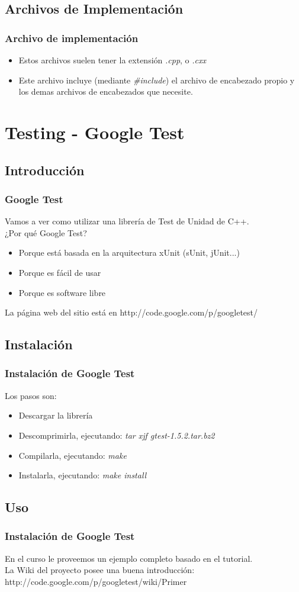 \documentclass{beamer}
\begin{document}
\subsection{Archivos de Implementación}
\begin{frame}
 \frametitle{Archivo de implementación}
\begin{itemize}

 \item Estos archivos suelen tener la extensión \emph{.cpp}, o \emph{.cxx}
 \item Este archivo incluye (mediante \emph{\#include}) el archivo de encabezado propio y los demas archivos de encabezados que necesite.
\end{itemize}

\end{frame}

\section{Testing - Google Test}

\subsection{Introducción}
\begin{frame}
\frametitle{Google Test}
Vamos a ver como utilizar una librería de Test de Unidad de C++. \\
¿Por qué Google Test?
\begin{itemize}
 \item Porque está basada en la arquitectura xUnit (sUnit, jUnit...)
 \item Porque es fácil de usar
 \item Porque es software libre
\end{itemize}

La página web del sitio está en http://code.google.com/p/googletest/

\end{frame}

\subsection{Instalación}
\begin{frame}
\frametitle{Instalación de Google Test}
Los pasos son:
\begin{itemize}
 \item Descargar la librería
 \item Descomprimirla, ejecutando: \emph{tar xjf gtest-1.5.2.tar.bz2}
 \item Compilarla, ejecutando: \emph{make}
 \item Instalarla, ejecutando: \emph{make install}
\end{itemize}

\end{frame}

\subsection{Uso}
\begin{frame}
\frametitle{Instalación de Google Test}
En el curso le proveemos un ejemplo completo basado en el tutorial. \\
La Wiki del proyecto posee una buena introducción:
  http://code.google.com/p/googletest/wiki/Primer
\end{frame}
\end{document}
